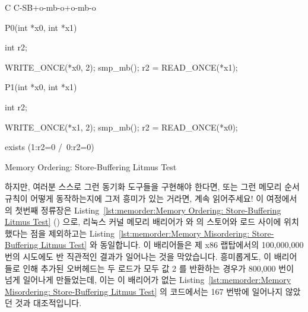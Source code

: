 \begin{listing}[tbp]
{ \scriptsize
\begin{verbbox}[\LstLineNo]
C C-SB+o-mb-o+o-mb-o
{
}

P0(int *x0, int *x1)
{
  int r2;

  WRITE_ONCE(*x0, 2);
  smp_mb();
  r2 = READ_ONCE(*x1);
}


P1(int *x0, int *x1)
{
  int r2;

  WRITE_ONCE(*x1, 2);
  smp_mb();
  r2 = READ_ONCE(*x0);
}

exists (1:r2=0 /\ 0:r2=0)
\end{verbbox}
}
\centering
\theverbbox
\caption{Memory Ordering: Store-Buffering Litmus Test}
\label{lst:memorder:Memory Ordering: Store-Buffering Litmus Test}
\end{listing}

하지만, 여러분 스스로 그런 동기화 도구들을 구현해야 한다면, 또는 그런 메모리
순서 규칙이 어떻게 동작하는지에 그저 흥미가 있는 거라면, 계속 읽어주세요!
이 여정에서의 첫번째 정류장은
Listing~\ref{lst:memorder:Memory Ordering: Store-Buffering Litmus Test}
() 으로,  리눅스 커널 메모리
배리어가  와  의 스토어와 로드 사이에 위치했다는 점을
제외하고는
Listing~\ref{lst:memorder:Memory Misordering: Store-Buffering Litmus Test}
와 동일합니다.
이 배리어들은 제 x86 랩탑에서의 100,000,000 번의 시도에도 반 직관적인 결과가
일어나는 것을 막았습니다.
흥미롭게도, 이 배리어들로 인해 추가된 오버헤드는 두 로드가 모두 값 2 를
반환하는 경우가 800,000 번이 넘게 일어나게 만들었는데, 이는 이 배리어가 없는
Listing~\ref{lst:memorder:Memory Misordering: Store-Buffering Litmus Test} 의
코드에서는 167 번밖에 일어나지 않았던 것과 대조적입니다.

